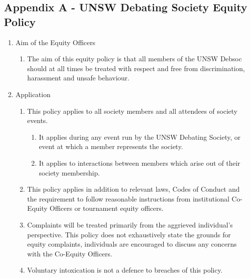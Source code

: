 \renewcommand\thesubsection{}
\subsection{Appendix A - UNSW Debating Society Equity Policy}
\renewcommand\thesubsection{\Alph{subsection}}

\begin{enumerate}
\item Aim of the Equity Officers
  \begin{enumerate}
  \item The aim of this equity policy is that all members of the UNSW Debsoc should at all times be treated with respect and free from discrimination, harassment and unsafe behaviour.
  \end{enumerate}

\item Application
  \begin{enumerate}
  \item This policy applies to all society members and all attendees of society events.
  \begin{enumerate}
    \item It applies during any event run by the UNSW Debating Society, or event at which a member represents the society.
    \item It applies to interactions between members which arise out of their society membership.
  \end{enumerate}
  \item This policy applies in addition to relevant laws, Codes of Conduct and the requirement to follow reasonable instructions from institutional Co-Equity Officers or tournament equity officers.
  \item Complaints will be treated primarily from the aggrieved individual’s perspective. This policy does not exhaustively state the grounds for equity complaints, individuals are encouraged to discuss any concerns with the Co-Equity Officers.
  \item Voluntary intoxication is not a defence to breaches of this policy.
  \end{enumerate}


\end{enumerate}
